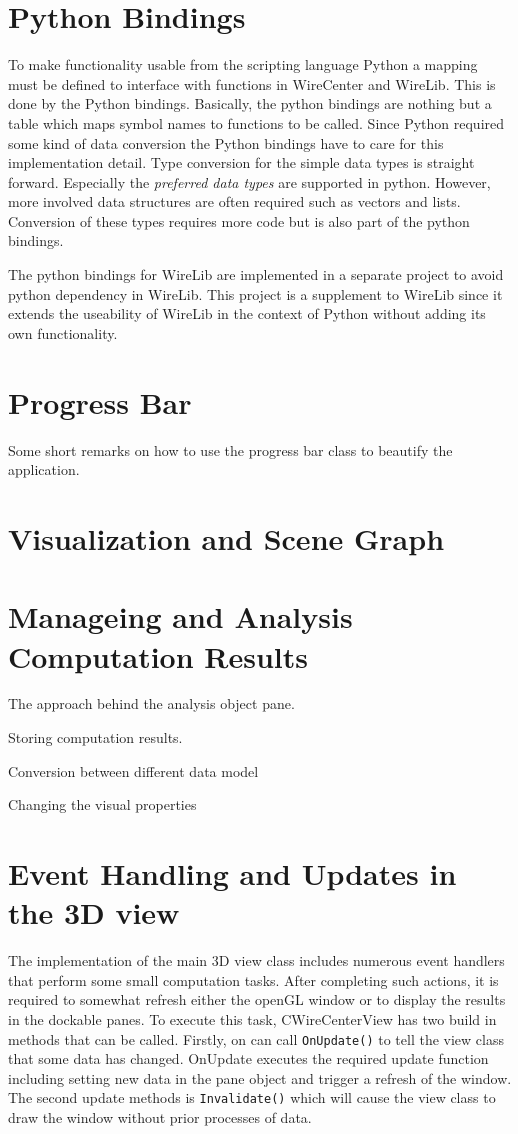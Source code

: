 \documentclass[11pt,a4paper,onepage,openany]{book}
\begin{document}
\section{Python Bindings}
To make functionality usable from the scripting language Python a mapping must
be defined to interface with functions in WireCenter and WireLib. This is done
by the Python bindings. Basically, the python bindings are nothing but a table
which maps symbol names to functions to be called. Since Python required some
kind of data conversion the Python bindings have to care for this
implementation detail. Type conversion for the simple data types is straight
forward. Especially the \emph{preferred data types} are supported in python.
However, more involved data structures are often required such as vectors and
lists. Conversion of these types requires more code but is also part of the
python bindings.

The python bindings for WireLib are implemented in a separate project to avoid
python dependency in WireLib. This project is a supplement to WireLib since it
extends the useability of WireLib in the context of Python without adding its
own functionality.

\section{Progress Bar}
Some short remarks on how to use the progress bar class to beautify the
application.

\section{Visualization and Scene Graph}

\section{Manageing and Analysis Computation Results}
The approach behind the analysis object pane.

Storing computation results.

Conversion between different data model

Changing the visual properties

\section{Event Handling and Updates in the 3D view}
The implementation of the main 3D view class includes numerous event handlers
that perform some small computation tasks. After completing such actions, it is
required to somewhat refresh either the openGL window or to display the results
in the dockable panes. To execute this task, CWireCenterView has two build in
methods that can be called. Firstly, on can call \texttt{OnUpdate()} to tell
the view class that some data has changed. OnUpdate executes the required
update function including setting new data in the pane object and trigger a
refresh of the window. The second update methods is \texttt{Invalidate()} which
will cause the view class to draw the window without prior processes of data.
\end{document}
